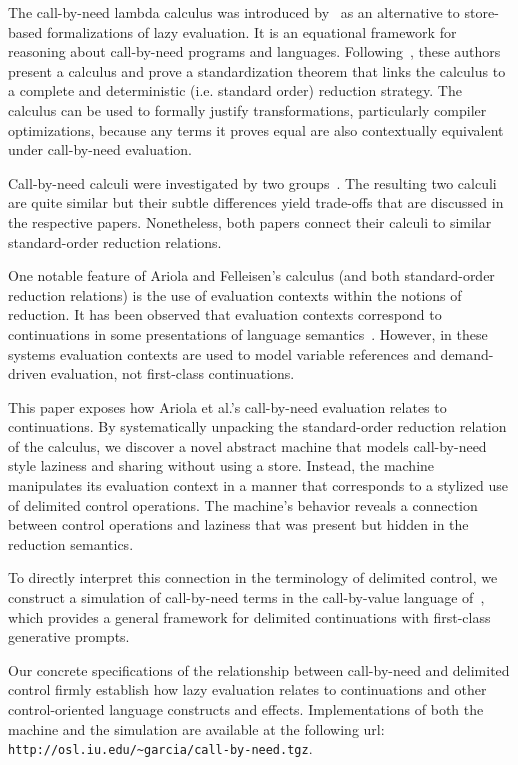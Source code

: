 \documentclass{LMCS}
\theoremstyle{plain}
\theoremstyle{remark}
\begin{document}
The call-by-need lambda calculus was introduced by~\citet{ariola95need} as an
alternative to store-based formalizations of lazy evaluation.  It is an
equational framework for reasoning about call-by-need programs and languages.
Following~\citet{plotkin75byname}, these authors present a calculus and prove a
standardization theorem that links the calculus to a complete and deterministic
(i.e. standard order) reduction strategy.  The calculus can be used to formally
justify transformations, particularly compiler optimizations, because any terms
it proves equal are also contextually equivalent under call-by-need evaluation.

Call-by-need calculi were investigated by two
groups~\cite{maraist98need,ariola97need}.  The resulting two calculi are quite
similar but their subtle differences yield trade-offs that are discussed in the
respective papers.  Nonetheless, both papers connect their calculi to similar
standard-order reduction relations.

One notable feature of Ariola and Felleisen's calculus (and both standard-order
reduction relations) is the use of evaluation contexts within the notions of
reduction.  It has been observed that evaluation contexts correspond to
continuations in some presentations of language
semantics~\cite{felleisen86secd,biernacka07framework}.  However, in these
systems evaluation contexts are used to model variable references and
demand-driven evaluation, not first-class continuations.

This paper exposes how Ariola et al.'s call-by-need evaluation relates
to continuations.  By systematically unpacking the standard-order reduction
relation of the calculus, we discover a novel abstract machine that models
call-by-need style laziness and sharing without using a store.  Instead, the
machine manipulates its evaluation context in a manner that corresponds to a
stylized use of delimited control operations.  The machine's behavior reveals a
connection between control operations and laziness that was present but hidden
in the reduction semantics.

To directly interpret this connection in the terminology of delimited control,
we construct a simulation of call-by-need terms in the call-by-value language
of~\citet{dybvig07monadic}, which provides a general framework for delimited
continuations with first-class generative prompts. 




Our concrete specifications of the relationship between call-by-need and
delimited control firmly establish how lazy evaluation relates to continuations
and other control-oriented language constructs and effects.
Implementations of both the machine and the simulation are available at the
following url: \\
\verb|http://osl.iu.edu/~garcia/call-by-need.tgz|.
\end{document}
